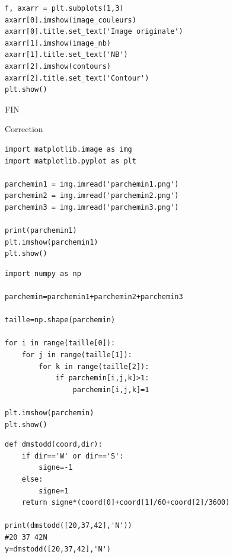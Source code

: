\begin{verbatim}
f, axarr = plt.subplots(1,3)
axarr[0].imshow(image_couleurs)
axarr[0].title.set_text('Image originale')
axarr[1].imshow(image_nb)
axarr[1].title.set_text('NB')
axarr[2].imshow(contours)
axarr[2].title.set_text('Contour')
plt.show()
\end{verbatim}


\begin{center}
\Large{FIN}
\end{center}

\ifdef{\public}{}{\cleardoublepage\pagestyle{correction}}


\begin{center}
\Large{Correction}
\end{center}

\reponse{}

\begin{verbatim}
import matplotlib.image as img
import matplotlib.pyplot as plt

parchemin1 = img.imread('parchemin1.png')
parchemin2 = img.imread('parchemin2.png')
parchemin3 = img.imread('parchemin3.png')

print(parchemin1)
plt.imshow(parchemin1)
plt.show()
\end{verbatim}

\reponse{}

\begin{verbatim}
import numpy as np

parchemin=parchemin1+parchemin2+parchemin3

taille=np.shape(parchemin)

for i in range(taille[0]):
    for j in range(taille[1]):
        for k in range(taille[2]):
            if parchemin[i,j,k]>1:
                parchemin[i,j,k]=1

plt.imshow(parchemin)
plt.show()
\end{verbatim}

\reponse{}

\begin{verbatim}
def dmstodd(coord,dir):
    if dir=='W' or dir=='S':
        signe=-1
    else:
        signe=1
    return signe*(coord[0]+coord[1]/60+coord[2]/3600)
    
print(dmstodd([20,37,42],'N'))
#20 37 42N
y=dmstodd([20,37,42],'N')
\end{verbatim}

